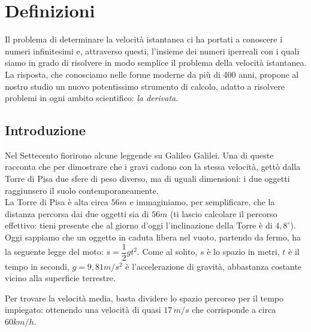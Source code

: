 \section{Definizioni}
\label{sec:differenziazione_definizioni}
Il problema di determinare la velocità istantanea ci ha portati a conoscere 
i numeri infinitesimi e, attraverso questi, l'insieme dei numeri iperreali 
con i quali siamo in grado di risolvere in modo semplice il problema della 
velocità istantanea.
La risposta, che conosciamo nelle forme moderne da più di 400 anni,
propone al nostro studio un nuovo potentissimo strumento di calcolo, 
adatto a risolvere problemi in ogni ambito scientifico: \emph{la derivata}.

\subsection{Introduzione}
\label{subsec:differenziazione_introduzione}
Nel Settecento fiorirono alcune leggende su Galileo Galilei. Una di queste 
racconta che per dimostrare che i gravi cadono con la stessa velocità, 
gettò dalla Torre di Pisa due sfere di peso diverso, ma di uguali 
dimensioni: i due oggetti raggiunsero il suolo 
contemporaneamente.\\
La Torre di Pisa è alta circa \(56m\) e immaginiamo, per semplificare, 
che la distanza percorsa dai due oggetti sia di \(56m\) (ti lascio 
calcolare il percorso effettivo: tieni presente che al giorno d'oggi 
l'inclinazione della Torre è di \(4,8^\circ\)).\\
Oggi sappiamo che un oggetto in caduta libera nel vuoto, 
partendo da fermo, ha la seguente legge del moto:
\(s=\dfrac{1}{2}gt^2\). Come al solito, \(s\) è lo spazio in metri, 
\(t\) è il tempo in secondi, \(g=9,81 m/s^2\) è l'accelerazione di 
gravità, abbastanza costante vicino alla superficie terrestre.

Per trovare la velocità media, basta dividere lo spazio percorso per il 
tempo impiegato: ottenendo una velocità di quasi \(17\,m/s\) che 
corrisponde a circa \(60 km/h\). 




